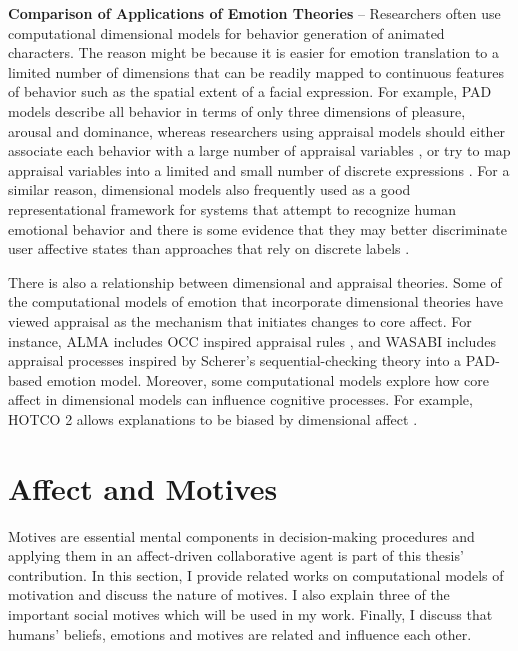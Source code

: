 \documentclass[12pt]{report}
\begin{document}
\textbf{Comparison of Applications of Emotion Theories} -- Researchers often use
computational dimensional models for behavior generation of animated characters.
The reason might be because it is easier for emotion translation to a limited
number of dimensions that can be readily mapped to continuous features of
behavior such as the spatial extent of a facial expression. For example, PAD
models describe all behavior in terms of only three dimensions of pleasure,
arousal and dominance, whereas researchers using appraisal models should either
associate each behavior with a large number of appraisal variables
\cite{scherer:expression-appraisal}
\cite{smith:computational-facial-expression}, or try to map appraisal variables
into a limited and small number of discrete expressions
\cite{elliott:affective-reasoner}. For a similar reason, dimensional models also
frequently used as a good representational framework for systems that attempt to
recognize human emotional behavior and there is some evidence that they may
better discriminate user affective states than approaches that rely on discrete
labels \cite{barrett:emotions-natural}.

There is also a relationship between dimensional and appraisal theories. Some of
the computational models of emotion that incorporate dimensional theories have
viewed appraisal as the mechanism that initiates changes to core affect. For
instance, ALMA \cite{gebhard:alma} includes OCC inspired appraisal rules
\cite{occ:structure}, and WASABI \cite{becker:wasabi} includes appraisal
processes inspired by Scherer's sequential-checking theory into a PAD-based
emotion model. Moreover, some computational models explore how core affect in
dimensional models can influence cognitive processes. For example, HOTCO 2
\cite{thagard:emotional-coherence} allows explanations to be biased by
dimensional affect \cite{marsella:computational-models}.

\section{Affect and Motives}

Motives are essential mental components in decision-making procedures and
applying them in an affect-driven collaborative agent is part of this thesis'
contribution. In this section, I provide related works on computational models
of motivation and discuss the nature of motives. I also explain three of the
important social motives which will be used in my work. Finally, I discuss that
humans' beliefs, emotions and motives are related and influence each other. 
\end{document}
